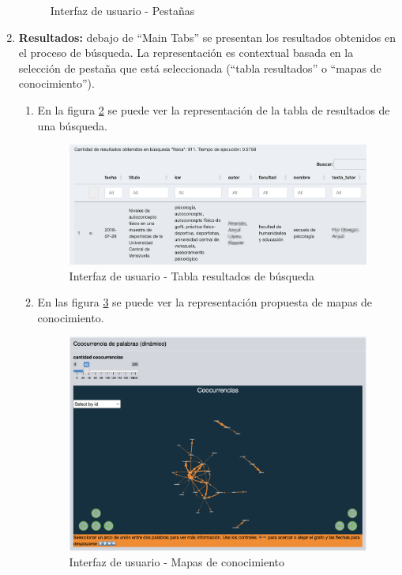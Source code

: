 \documentclass[
  12pt,
  openany]{book}
\begin{document}
\begin{enumerate}
\begin{figure}
{  }

  \caption{Interfaz de usuario - Pestañas }\label{fig:maintab}
  \end{figure}
\item
  \textbf{Resultados:} debajo de ``Main Tabs'' se presentan los resultados obtenidos en el proceso de búsqueda. La representación es contextual basada en la selección de pestaña que está seleccionada (``tabla resultados'' o ``mapas de conocimiento'').

  \begin{enumerate}
  \def\labelenumii{\arabic{enumii}.}
  \item
    En la figura \ref{fig:tablaresultados2} se puede ver la representación de la tabla de resultados de una búsqueda.

    \begin{figure}

    {\centering \includegraphics[width=0.9\linewidth]{images/05-desarrollo/4_ciclo/UI/tablaresultado} 

    }

    \caption{Interfaz de usuario - Tabla resultados de búsqueda}\label{fig:tablaresultados2}
    \end{figure}
  \item
    En las figura \ref{fig:tablaresultados3} se puede ver la representación propuesta de mapas de conocimiento.

    \begin{figure}

    {\centering \includegraphics[width=0.7\linewidth]{images/05-desarrollo/4_ciclo/UI/uimapas} 

    }

    \caption{Interfaz de usuario - Mapas de conocimiento}\label{fig:tablaresultados3}
    \end{figure}
  \end{enumerate}
\end{enumerate}
\end{document}
